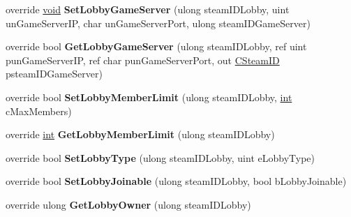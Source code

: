 \begin{DoxyCompactItemize}
\item 
\hypertarget{classValve_1_1Steamworks_1_1CSteamMatchmaking_a39423a9b0d30b422c2463be963869f28}{}override \hyperlink{SDL__audio_8h_a52835ae37c4bb905b903cbaf5d04b05f}{void} {\bfseries Set\+Lobby\+Game\+Server} (ulong steam\+I\+D\+Lobby, uint un\+Game\+Server\+I\+P, char un\+Game\+Server\+Port, ulong steam\+I\+D\+Game\+Server)\label{classValve_1_1Steamworks_1_1CSteamMatchmaking_a39423a9b0d30b422c2463be963869f28}

\item 
\hypertarget{classValve_1_1Steamworks_1_1CSteamMatchmaking_ac8684d1a73f703202120bc15c9a11808}{}override bool {\bfseries Get\+Lobby\+Game\+Server} (ulong steam\+I\+D\+Lobby, ref uint pun\+Game\+Server\+I\+P, ref char pun\+Game\+Server\+Port, out \hyperlink{structValve_1_1Steamworks_1_1CSteamID}{C\+Steam\+I\+D} psteam\+I\+D\+Game\+Server)\label{classValve_1_1Steamworks_1_1CSteamMatchmaking_ac8684d1a73f703202120bc15c9a11808}

\item 
\hypertarget{classValve_1_1Steamworks_1_1CSteamMatchmaking_a22a95b8f8d84d08fc2cd261d75ca52fc}{}override bool {\bfseries Set\+Lobby\+Member\+Limit} (ulong steam\+I\+D\+Lobby, \hyperlink{SDL__thread_8h_a6a64f9be4433e4de6e2f2f548cf3c08e}{int} c\+Max\+Members)\label{classValve_1_1Steamworks_1_1CSteamMatchmaking_a22a95b8f8d84d08fc2cd261d75ca52fc}

\item 
\hypertarget{classValve_1_1Steamworks_1_1CSteamMatchmaking_af94df90350e3a181f518bf637d171624}{}override \hyperlink{SDL__thread_8h_a6a64f9be4433e4de6e2f2f548cf3c08e}{int} {\bfseries Get\+Lobby\+Member\+Limit} (ulong steam\+I\+D\+Lobby)\label{classValve_1_1Steamworks_1_1CSteamMatchmaking_af94df90350e3a181f518bf637d171624}

\item 
\hypertarget{classValve_1_1Steamworks_1_1CSteamMatchmaking_ad7d565b58baddd445d8ed793bb1f33f3}{}override bool {\bfseries Set\+Lobby\+Type} (ulong steam\+I\+D\+Lobby, uint e\+Lobby\+Type)\label{classValve_1_1Steamworks_1_1CSteamMatchmaking_ad7d565b58baddd445d8ed793bb1f33f3}

\item 
\hypertarget{classValve_1_1Steamworks_1_1CSteamMatchmaking_a9cc498c181e2cd82b93ed0cdc1df19cd}{}override bool {\bfseries Set\+Lobby\+Joinable} (ulong steam\+I\+D\+Lobby, bool b\+Lobby\+Joinable)\label{classValve_1_1Steamworks_1_1CSteamMatchmaking_a9cc498c181e2cd82b93ed0cdc1df19cd}

\item 
\hypertarget{classValve_1_1Steamworks_1_1CSteamMatchmaking_aa6a49fbb6496d8444872a66dc0160594}{}override ulong {\bfseries Get\+Lobby\+Owner} (ulong steam\+I\+D\+Lobby)\label{classValve_1_1Steamworks_1_1CSteamMatchmaking_aa6a49fbb6496d8444872a66dc0160594}


\end{DoxyCompactItemize}
